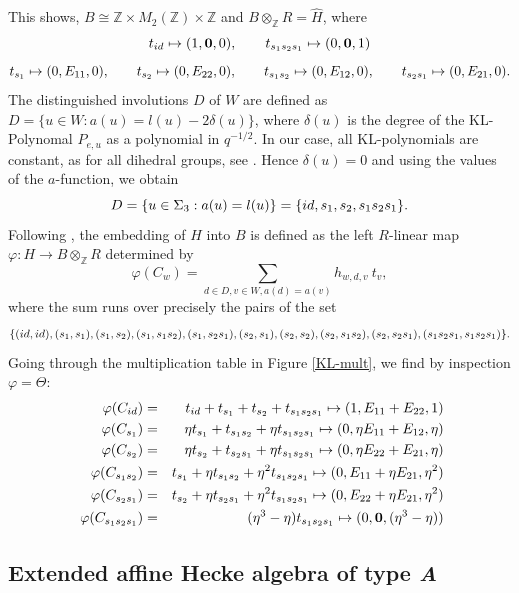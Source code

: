 \documentclass[oneside, a4paper, 11pt]{amsart}
\newcommand{\Z}{\mathbb{Z}}
\begin{document}
This shows, $B \cong \Z \times M_2(\Z) \times \Z$ and
$B\otimes_{\mathbb{Z}} R = \widehat{H}$, where 
$$t_{id} \mapsto (1, \mathbf{0}, 0), \qquad t_{s_1s_2s_1} \mapsto (0,\mathbf{0},1)$$
$$ t_{s_1} \mapsto (0,E_{11},0), \qquad  t_{s_2} \mapsto (0,E_{22},0), \qquad t_{s_1s_2}
\mapsto (0,E_{12},0), \qquad  t_{s_2s_1}\mapsto (0,E_{21},0).$$
The distinguished involutions $D$ of $W$ are defined as $D = \{ u\in W :
a(u)=l(u)-2\delta(u)\}$, where $\delta(u)$ is the degree of the KL-Polynomal
$P_{e,u}$ as a polynomial in $q^{-1/2}$. In our case, all KL-polynomials are
constant, as for all dihedral groups, see \cite[7.12(a)]{humphreys}.
Hence $\delta(u)=0$ and using the values of the $a$-function, we
obtain 
$$  D = \{ u\in \Sigma_3 : a(u)=l(u)\} = \{ id, s_1, s_2, s_1s_2s_1\}.$$
Following \cite[2.4]{Lusztig2}, the embedding of $H$ into $B$ is defined as
the left $R$-linear map $\varphi:H \to B\otimes_{\mathbb{Z}} R$ determined by 
$$\varphi(C_w) = \sum_{d\in D, v\in W, a(d)=a(v)} h_{w,d,v}\: t_v,$$
where the sum runs over precisely the pairs of the set
$$\{ (id,id), (s_1,s_1),(s_1,s_2), (s_1,s_1s_2), (s_1, s_2s_1), (s_2,s_1), (s_2,s_2), (s_2, s_1s_2), (s_2,s_2s_1), (s_1s_2s_1, s_1s_2s_1)\}.$$
Going through the multiplication table in Figure \ref{KL-mult}, we find by inspection $\varphi = \Theta$:
\begin{eqnarray*}
\varphi(C_{id}) &=& t_{id} + t_{s_1} + t_{s_2} + t_{s_1s_2s_1} \mapsto (1, E_{11}+E_{22}, 1)\\
\varphi(C_{s_1}) &=& \eta  t_{s_1} + t_{s_1s_2} + \eta t_{s_1s_2s_1} \mapsto (0, \eta E_{11} + E_{12}, \eta)\\
\varphi(C_{s_2}) &=& \eta  t_{s_2} + t_{s_2s_1} + \eta t_{s_1s_2s_1} \mapsto (0, \eta E_{22} + E_{21}, \eta)\\
\varphi(C_{s_1s_2}) &=&   t_{s_1} + \eta t_{s_1s_2} + \eta^2 t_{s_1s_2s_1} \mapsto (0, E_{11} + \eta E_{21}, \eta^2)\\\
\varphi(C_{s_2s_1}) &=&   t_{s_2} + \eta t_{s_2s_1} + \eta^2 t_{s_1s_2s_1} \mapsto (0, E_{22} + \eta E_{21}, \eta^2)\\\
\varphi(C_{s_1s_2s_1}) &=&   (\eta^3-\eta) t_{s_1s_2s_1}  \mapsto (0, \mathbf{0}, (\eta^3-\eta))\\
\end{eqnarray*}


\subsection{Extended affine Hecke algebra of type \emph{A}}
\end{document}

